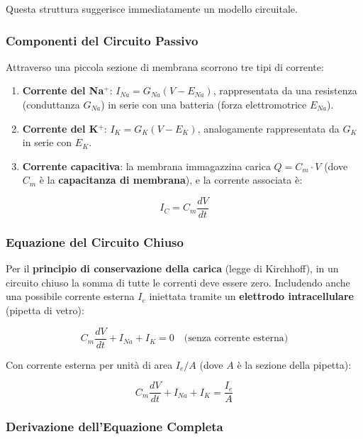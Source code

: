 Questa struttura suggerisce immediatamente un modello circuitale.

\subsubsection{Componenti del Circuito Passivo}

Attraverso una piccola sezione di membrana scorrono tre tipi di corrente:

\begin{enumerate}
    \item \textbf{Corrente del Na$^+$}: $I_{Na} = G_{Na}(V - E_{Na})$, rappresentata da una resistenza (conduttanza $G_{Na}$) in serie con una batteria (forza elettromotrice $E_{Na}$).
    \item \textbf{Corrente del K$^+$}: $I_K = G_K(V - E_K)$, analogamente rappresentata da $G_K$ in serie con $E_K$.
    \item \textbf{Corrente capacitiva}: la membrana immagazzina carica $Q = C_m \cdot V$ (dove $C_m$ è la \textbf{capacitanza di membrana}), e la corrente associata è:
\end{enumerate}

\begin{equation}
I_C = C_m \frac{dV}{dt}
\end{equation}

\subsubsection{Equazione del Circuito Chiuso}

Per il \textbf{principio di conservazione della carica} (legge di Kirchhoff), in un circuito chiuso la somma di tutte le correnti deve essere zero. Includendo anche una possibile corrente esterna $I_e$ iniettata tramite un \textbf{elettrodo intracellulare} (pipetta di vetro):

\begin{equation}
C_m \frac{dV}{dt} + I_{Na} + I_K = 0 \quad \text{(senza corrente esterna)}
\end{equation}

Con corrente esterna per unità di area $I_e/A$ (dove $A$ è la sezione della pipetta):

\begin{equation}
C_m \frac{dV}{dt} + I_{Na} + I_K = \frac{I_e}{A}
\end{equation}


\subsubsection{Derivazione dell'Equazione Completa}

